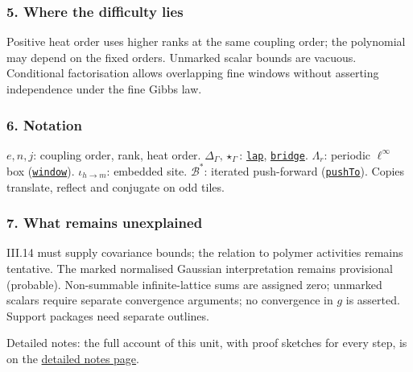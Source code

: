 \documentclass[
  letterpaper,
  11pt]{article}
\begin{document}
\subsubsection{5. Where the difficulty
lies}\label{where-the-difficulty-lies-10}

Positive heat order uses higher ranks at the same coupling order; the
polynomial may depend on the fixed orders. Unmarked scalar bounds are
vacuous. Conditional factorisation allows overlapping fine windows
without asserting independence under the fine Gibbs law.

\subsubsection{6. Notation}\label{notation-10}

\(e,n,j\): coupling order, rank, heat order.
\(\Delta_\Gamma,\star_\Gamma\):
\href{https://github.com/yang-mills-group/OpenAI-YM-20261028/blob/3456e5e75cf8d4cd558955a5c7638fba2d68f464/YM/RG08/Forms/Lap.lean\#L17}{\texttt{lap}},
\href{https://github.com/yang-mills-group/OpenAI-YM-20261028/blob/3456e5e75cf8d4cd558955a5c7638fba2d68f464/YM/RG08/Forms/Weld.lean\#L21}{\texttt{bridge}}.
\(\Lambda_r\): periodic \(\ell^\infty\) box
(\href{https://github.com/yang-mills-group/OpenAI-YM-20261028/blob/3456e5e75cf8d4cd558955a5c7638fba2d68f464/YM/Push/GRID_APPROXIMATION/Cone.lean\#L22-L23}{\texttt{window}}).
\(\iota_{h\to m}\): embedded site. \(\mathcal B^*\): iterated
push-forward
(\href{https://github.com/yang-mills-group/OpenAI-YM-20261028/blob/3456e5e75cf8d4cd558955a5c7638fba2d68f464/YM/Push/GRID_APPROXIMATION/Iterate.lean\#L27-L29}{\texttt{pushTo}}).
Copies translate, reflect and conjugate on odd tiles.

\subsubsection{7. What remains
unexplained}\label{what-remains-unexplained-10}

III.14 must supply covariance bounds; the relation to polymer activities
remains tentative. The marked normalised Gaussian interpretation remains
provisional (probable). Non-summable infinite-lattice sums are assigned
zero; unmarked scalars require separate convergence arguments; no
convergence in \(g\) is asserted. Support packages need separate
outlines.

Detailed notes: the full account of this unit, with proof sketches for
every step, is on the
\href{https://github.com/scottnarmstrong/yang-mills-informalization/blob/main/outline/notes/III-8.md}{detailed
notes page}.
\end{document}
